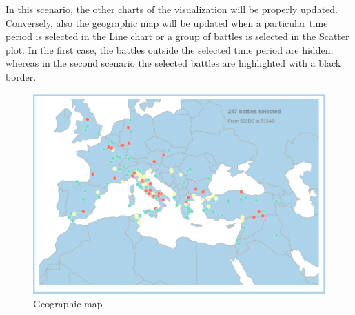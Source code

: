 In this scenario, the other charts of the visualization will be properly updated. Conversely, also the geographic map will be updated when a particular time period is selected in the Line chart or a group of battles is selected in the Scatter plot. In the first case, the battles outside the selected time period are hidden, whereas in the second scenario the selected battles are highlighted with a black border.
\begin{figure}[h]
\centering
\includegraphics[scale=0.20]{./images/geographic_map.png}
\caption{Geographic map}
\end{figure}

